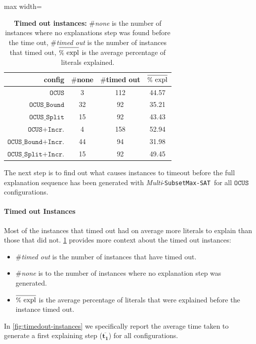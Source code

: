 \documentclass[twoside,11pt]{article}
\newcommand\mm[1]{\ensuremath{#1}\xspace}
\newcommand\call[1]{\mm{\texttt{#1}}}
\newcommand\subsetmaxsat{\texttt{SubsetMax-SAT}}
\newcommand\comus{\mm{\call{OCUS}}}
\newcommand{\comusbound}{\mm{\call{OCUS\_Bound}}}
\newcommand\comusincr{\mm{\call{OCUS+Incr.}}}
\newcommand\ousbiter{\mm{\call{OCUS\_Split}}}
\newcommand\ousbincr{\mm{\call{OCUS\_Bound+Incr.}}}
\newcommand\ousbiterincr{\mm{\call{OCUS\_Split+Incr.}}}
\begin{document}
	
	\begin{table}[!h]
		\centering
		\begin{adjustbox}{max width=\textwidth} 	
			\begin{tabular}{r|c|c|c}
				\textbf{config} & $\#$none&$\#$timed out  &        $\mathbf{\overline{ \raisebox{0pt}[1.2\height]{{\text{\small \%}} expl}}}$  \\ %
				\midrule
				\comus &   3 & 112 &   44.57 \\
				\comusbound &   32 & 92  & 35.21 \\
				\ousbiter &   15 & 92 &  43.43  \\\hline
				\comusincr &   4 & 158  & 52.94  \\
				\ousbincr &   44 & 94 &  31.98 \\
				\ousbiterincr &   15 & 92  & 49.45  \\
			\end{tabular}
			
		\end{adjustbox}
		\caption{\textbf{Timed out instances:} \emph{$\#$none} is the number of instances where no explanations step was found before the time out, \emph{$\#$timed out} is the number of instances that timed out, $\overline{\raisebox{0pt}[9pt]{{\small \%} expl}}$ is the average percentage of literals explained.}
		\label{tab:timed-out-instances-indiv-explanations-all}
	\end{table}
	
The next step is to find out what causes instances to timeout before the full explanation sequence has been generated with \emph{Multi}-\subsetmaxsat~for all \comus configurations. 

\paragraph{Timed out Instances} Most of the instances that timed out had on average more literals to explain than those that did not.
\cref{tab:timed-out-instances-indiv-explanations-all} provides more context about the timed out instances: 
\begin{itemize}
	\item \emph{$\#$timed out} is the number of instances that have timed out.
	\item \emph{$\#$none} is to the number of instances where no explanation step was generated.
	\item 	$\mathbf{\overline{ \raisebox{0pt}[1.2\height]{{\text{\small \%}} expl}}}$ is the average percentage of literals that were explained before the instance timed out.
\end{itemize}
In \cref{fig:timedout-instances} we specifically report the average time taken to generate a first explaining step ($\mathbf{\overline{t_{1}}}$) for all configurations. 
\end{document}
